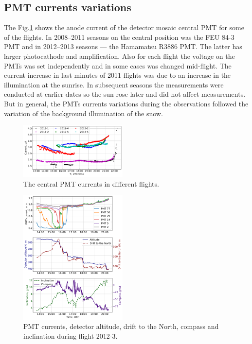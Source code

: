 \documentclass[final,5p,times,twocolumn]{elsarticle}
\begin{document}
\subsection{PMT currents variations}

 The Fig.\ref{fig:current} shows the anode current of the detector mosaic central PMT for some of the flights. In 2008--2011 seasons on the central position was the FEU 84-3 PMT and in 2012--2013 seasons --- the Hamamatsu R3886 PMT. The latter has larger photocathode and amplification. Also for each flight the voltage on the PMTs was set independently and in some cases was changed mid-flight. The current increase in last minutes of 2011 flights was due to an increase in the illumination at the sunrise. In subsequent seasons the measurements were conducted at earlier dates so the sun rose later and did not affect measurements. But in general, the PMTs currents variations during the observations followed the variation of the background illumination of the snow.

\begin{figure}[tb]
    \includegraphics[width=0.48\textwidth]{hv-53.pdf}
    \caption{The central PMT currents in different flights.}
\label{fig:current}
\end{figure}

\begin{figure}[tb]
    \includegraphics[width=0.48\textwidth]{2012-3_currents_H_dN.pdf}
    \caption{PMT currents, detector altitude, drift to the North, compass and inclination during flight 2012-3.}
    \label{fig:2012-3_currents}
\end{figure}
\end{document}
